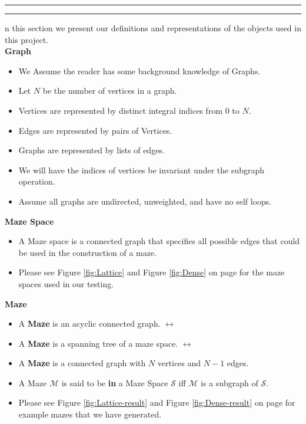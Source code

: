 \documentclass[11pt]{article}
\newcommand{\question}[2] {\vspace{.25in} \hrule\vspace{0.5em}
\noindent{\bf #1: #2} \vspace{0.5em}
\hrule \vspace{.10in}}
\begin{document}
\newpage

\question{Background}

In this section we present our definitions and representations of the objects used in this project.\\

\textbf{Graph}
\begin{itemize}
\item We Assume the reader has some background knowledge of Graphs.
\item Let $N$ be the number of vertices in a graph.
\item Vertices are represented by distinct integral indices from 0 to $N$.
\item Edges are represented by pairs of Vertices.
\item Graphs are represented by lists of edges.
\item We will have the indices of vertices be invariant under the subgraph operation.
\item Assume all graphs are undirected, unweighted, and have no self loops.
\end{itemize}


\textbf{Maze Space}
\begin{itemize}
\item A Maze space is a connected graph that specifies all possible edges that could be used in the construction of a maze.
\item Please see Figure \ref{fig:Lattice} and Figure \ref{fig:Dense} on page \pageref{fig:Lattice} for the maze spaces used in our testing.
\end{itemize}

\textbf{Maze}
\begin{itemize}
\item A \textbf{Maze} is an acyclic connected graph. $\leftrightarrow$
\item A \textbf{Maze} is a spanning tree of a maze space. $\leftrightarrow$
\item A \textbf{Maze} is a connected graph with $N$ vertices and $N - 1$ edges.\\
\item A Maze $\mathcal{M}$ is said to be \textbf{in} a Maze Space $\mathcal{S}$ iff $\mathcal{M}$ is a subgraph of $\mathcal{S}$.
\item Please see Figure \ref{fig:Lattice-result} and Figure \ref{fig:Dense-result} on page  \pageref{fig:Lattice-result} for example mazes that we have generated.
\end{itemize}
\end{document}
